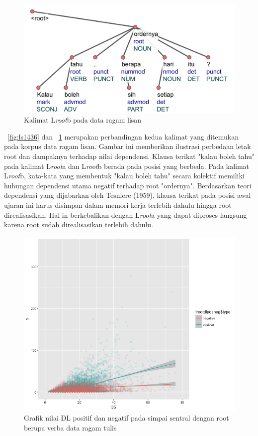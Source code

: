 \begin{figure}
	\centering \includegraphics[width=1
	\textwidth] {pics/ls1460.jpg} 
	\caption{Kalimat L\textit{root}b pada data ragam lisan}
	\label{fig:ls1460} 
\end{figure}

\pic~\ref{fig:ls1436} dan \pic~\ref{fig:ls1460} merupakan perbandingan kedua kalimat yang ditemukan pada korpus data ragam lisan. Gambar ini memberikan ilustrasi perbedaan letak root dan dampaknya terhadap nilai dependensi. Klausa terikat "kalau boleh tahu" pada kalimat L\textit{root}a dan L\textit{root}b berada pada posisi yang berbeda. Pada kalimat L\textit{root}b, kata-kata yang membentuk "kalau boleh tahu" secara kolektif memiliki hubungan dependensi utama negatif terhadap root "ordernya". Berdasarkan teori dependensi yang dijabarkan oleh Tesniere (1959), klausa terikat pada posisi awal ujaran ini harus disimpan dalam memori kerja terlebih dahulu hingga root direalisasikan. Hal in berkebalikan dengan L\textit{root}a yang dapat diproses langsung karena root sudah direalisasikan terlebih dahulu.

\begin{figure}
	\centering \includegraphics[width=1
	\textwidth] {pics/tulisroot_DLposneg.png} 
	\caption{Grafik nilai DL positif dan negatif pada simpai sentral dengan root berupa verba data ragam tulis}
	\label{fig:tulisroot_DLposneg} 
\end{figure}

